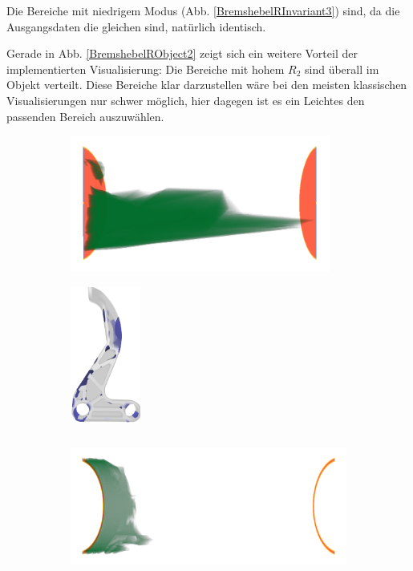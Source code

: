 \documentclass[a4paper,fontsize=12pt,toc=bib,halfparskip]{scrartcl}
\begin{document}
Die Bereiche mit niedrigem Modus (Abb. \ref{BremshebelRInvariant3}) sind, da die Ausgangsdaten die gleichen sind, nat\"urlich identisch.

Gerade in Abb. \ref{BremshebelRObject2} zeigt sich ein weitere Vorteil der implementierten Visualisierung: Die Bereiche mit hohem $R_2$ sind \"uberall im Objekt verteilt. Diese Bereiche klar darzustellen w\"are bei den meisten klassischen Visualisierungen nur schwer m\"oglich, hier dagegen ist es ein Leichtes den passenden Bereich auszuw\"ahlen.

\begin{figure}
	\begin{subfigure}{0.49\textwidth}
		\centering
		\includegraphics[height=4.5cm]{pictures/results/Bremshebel_R_InvariantSpace1.png}
		\subcaption{}
		\label{BremshebelRInvariant1}
	\end{subfigure}
	\hspace*{\fill}
	\begin{subfigure}{0.49\textwidth}
		\centering
		\includegraphics[height=4.5cm]{pictures/results/Bremshebel_R_Object1.png}
		\subcaption{}
		\label{BremshebelRObject1}
	\end{subfigure}
	\medskip
	\begin{subfigure}{0.49\textwidth}
		\centering
		\includegraphics[height=4.5cm]{pictures/results/Bremshebel_R_InvariantSpace2.png}

\end{subfigure}
\end{figure}
\end{document}
